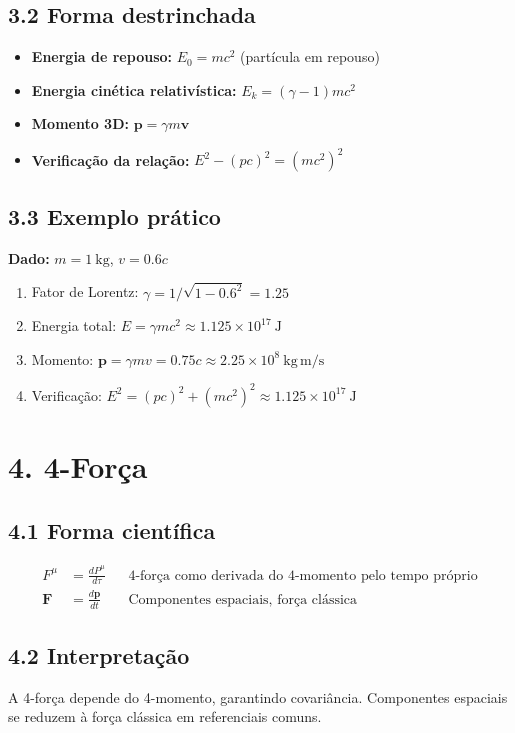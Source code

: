 \documentclass[a4paper,12pt]{article}
\begin{document}
\subsection*{3.2 Forma destrinchada}
\begin{itemize}
    \item \textbf{Energia de repouso:} $E_0 = mc^2$ (partícula em repouso)
    \item \textbf{Energia cinética relativística:} $E_k = (\gamma - 1)mc^2$
    \item \textbf{Momento 3D:} $\mathbf{p} = \gamma m \mathbf{v}$
    \item \textbf{Verificação da relação:} $E^2 - (pc)^2 = (mc^2)^2$
\end{itemize}

\subsection*{3.3 Exemplo prático}
\textbf{Dado:} $m = 1~\mathrm{kg}$, $v = 0.6c$
\begin{enumerate}
    \item Fator de Lorentz: $\gamma = 1/\sqrt{1-0.6^2} = 1.25$
    \item Energia total: $E = \gamma m c^2 \approx 1.125 \times 10^{17}~\mathrm{J}$
    \item Momento: $\mathbf{p} = \gamma m v = 0.75 c \approx 2.25 \times 10^8~\mathrm{kg\,m/s}$
    \item Verificação: $E^2 = (pc)^2 + (mc^2)^2 \approx 1.125 \times 10^{17}~\mathrm{J}$
\end{enumerate}

\section*{4. 4-Força}
\subsection*{4.1 Forma científica}
\begin{align}
F^\mu &= \frac{dP^\mu}{d\tau} && \text{4-força como derivada do 4-momento pelo tempo próprio}\\
\mathbf{F} &= \frac{d\mathbf{p}}{dt} && \text{Componentes espaciais, força clássica}
\end{align}

\subsection*{4.2 Interpretação}
A 4-força depende do 4-momento, garantindo covariância. Componentes espaciais se reduzem à força clássica em referenciais comuns.
\end{document}
